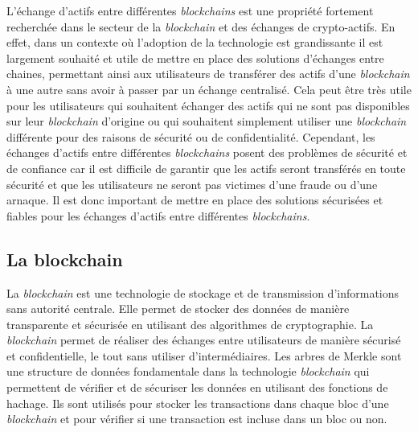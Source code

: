 L'échange d’\gls{actif}s entre différentes \textit{\gls{blockchain}s} est une propriété fortement recherchée dans le secteur de la
\textit{\gls{blockchain}} et des échanges de crypto-\gls{actif}s. En effet, dans un contexte où l’adoption de la technologie est
grandissante \cite{evolutionCrypto2022} il est largement souhaité et utile de mettre en place des solutions d’échanges entre chaines,
permettant ainsi aux utilisateurs de transférer des \gls{actif}s d’une \textit{\gls{blockchain}} à une autre sans avoir à passer par
un échange centralisé. Cela peut être très utile pour les utilisateurs qui souhaitent échanger des \gls{actif}s qui
ne sont pas disponibles sur leur \textit{\gls{blockchain}} d’origine ou qui souhaitent simplement utiliser une \textit{\gls{blockchain}}
différente pour des raisons de sécurité ou de confidentialité. Cependant, les échanges d’\gls{actif}s entre différentes
\textit{\gls{blockchain}s} posent des problèmes de sécurité et de confiance car il est difficile de garantir que les \gls{actif}s seront
transférés en toute sécurité et que les utilisateurs ne seront pas victimes d’une fraude ou d’une arnaque. Il est
donc important de mettre en place des solutions sécurisées et fiables pour les échanges d’\gls{actif}s entre différentes
\textit{\gls{blockchain}s}.

\subsection{La \gls{blockchain}}
La \textit{\gls{blockchain}} est une technologie de stockage et de transmission d’informations sans autorité centrale. Elle 
permet de stocker des données de manière transparente et sécurisée en utilisant des algorithmes de cryptographie. 
La \textit{\gls{blockchain}} permet de réaliser des échanges entre utilisateurs de manière sécurisé et confidentielle, 
le tout sans utiliser d'intermédiaires. Les arbres de Merkle sont une structure de données fondamentale 
dans la technologie \textit{\gls{blockchain}} qui permettent de vérifier et de sécuriser les données en utilisant des 
fonctions de hachage. Ils sont utilisés pour stocker les transactions dans 
chaque bloc d’une \textit{\gls{blockchain}} et pour vérifier si une transaction est incluse dans un bloc ou non.

